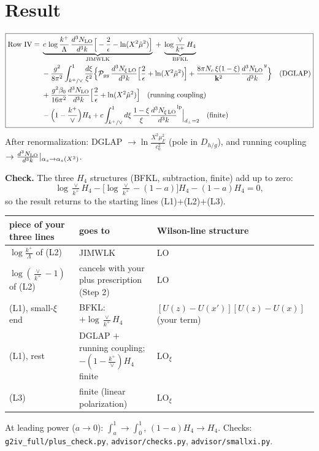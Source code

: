 \documentclass[10pt]{article}
\numberwithin{equation}{section}
\newcommand{\NLO}[1]{\frac{d^3N_{#1}}{d^3k}}
\begin{document}
\section{Result}
\begin{equation}
\boxed{\begin{aligned}
\text{Row IV}={}&\underbrace{c\,\log\frac{k^+}{\Lambda}\,\NLO{\rm LO}\Big[-\frac2\epsilon-\ln(X^2\hat\mu^2)\Big]}_{\rm JIMWLK}\;+\;\underbrace{\log\frac{\vee}{k^+}\,H_4}_{\rm BFKL}\\
&-\frac{g^2}{8\pi^2}\int_{k^+/\vee}^1\frac{d\xi}{\xi^2}\Big\{\mathcal P_{gg}\,\NLO{\xi\,\rm LO}\Big[\frac2\epsilon+\ln(X^2\hat\mu^2)\Big]+\frac{8\pi N_c\,\xi(1-\xi)}{\mathbf k^2}\NLO{\rm LO}^{y}\Big\}\quad\text{(DGLAP)}\\
&+\frac{g^2\beta_0}{16\pi^2}\NLO{\rm LO}\Big[\frac2\epsilon+\ln(X^2\hat\mu^2)\Big]\quad\text{(running coupling)}\\
&-\Big(1-\frac{k^+}{\vee}\Big)H_4+c\int_{k^+/\vee}^1d\xi\,\frac{1-\xi}{\xi}\NLO{\xi\,\rm LO}^{\rm lp}\Big|_{d_\perp=2}\quad\text{(finite)}
\end{aligned}}
\end{equation}
After renormalization: DGLAP $\to\ln\frac{X^2\mu_F^2}{c_0^2}$ (pole in $D_{h/g}$), and running coupling $\to\NLO{\rm LO}|_{\alpha_s\to\alpha_s(X^2)}$.

\noindent\textbf{Check.} The three $H_4$ structures (BFKL, subtraction, finite) add up to zero:
\begin{equation*}
\log\tfrac{\vee}{k^+}H_4-\big[\log\tfrac{\vee}{k^+}-(1-a)\big]H_4-(1-a)H_4=0 ,
\end{equation*}
so the result returns to the starting lines (L1)$+$(L2)$+$(L3).

\begin{center}\small
\begin{tabular}{@{}p{}p{}p{}@{}}\toprule
piece of your three lines & goes to & Wilson-line structure\\\midrule
$\log\frac{k^+}{\Lambda}$ of (L2) & JIMWLK & LO\\
$\log(\frac{\vee}{k^+}-1)$ of (L2) & cancels with your plus prescription (Step 2) & LO\\
(L1), small-$\xi$ end & BFKL: $+\log\frac{\vee}{k^+}H_4$ & $[U(z)-U(x')][U(z)-U(x)]$ (your term)\\
(L1), rest & DGLAP $+$ running coupling; $-(1-\frac{k^+}{\vee})H_4$ finite & LO$_\xi$\\
(L3) & finite (linear polarization) & LO$_\xi$\\\bottomrule
\end{tabular}
\end{center}
\noindent At leading power ($a\to0$): $\int_a^1\to\int_0^1$, $(1-a)H_4\to H_4$. Checks: \texttt{g2iv\_full/plus\_check.py}, \texttt{advisor/checks.py}, \texttt{advisor/smallxi.py}.
\end{document}
